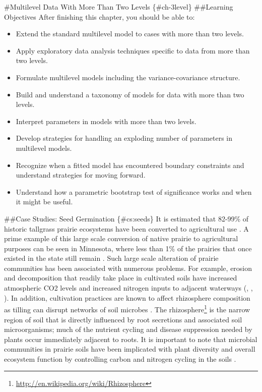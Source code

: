 \documentclass[
]{krantz}
\providecommand{\tightlist}{%
  \setlength{\itemsep}{0pt}\setlength{\parskip}{0pt}}
\renewcommand{\href}[2]{#2\footnote{\url{#1}}}
\begin{document}
\#Multilevel Data With More Than Two Levels \{\#ch-3level\}
\#\#Learning Objectives
After finishing this chapter, you should be able to:

\begin{itemize}
\tightlist
\item
  Extend the standard multilevel model to cases with more than two levels.
\item
  Apply exploratory data analysis techniques specific to data from more than two levels.
\item
  Formulate multilevel models including the variance-covariance structure.
\item
  Build and understand a taxonomy of models for data with more than two levels.
\item
  Interpret parameters in models with more than two levels.
\item
  Develop strategies for handling an exploding number of parameters in multilevel models.
\item
  Recognize when a fitted model has encountered boundary constraints and understand strategies for moving forward.
\item
  Understand how a parametric bootstrap test of significance works and when it might be useful.
\end{itemize}

\#\#Case Studies: Seed Germination \{\#cs:seeds\}
It is estimated that 82-99\% of historic tallgrass prairie ecosystems have been converted to agricultural use \citep{Baer2002}. A prime example of this large scale conversion of native prairie to agricultural purposes can be seen in Minnesota, where less than 1\% of the prairies that once existed in the state still remain \citep{Camill2004}. Such large scale alteration of prairie communities has been associated with numerous problems. For example, erosion and decomposition that readily take place in cultivated soils have increased atmospheric CO2 levels and increased nitrogen inputs to adjacent waterways (\citet{Baer2002}, \citet{Camill2004}, \citet{Knops2000}). In addition, cultivation practices are known to affect rhizosphere composition as tilling can disrupt networks of soil microbes \citep{Allison2005}. The \href{http://en.wikipedia.org/wiki/Rhizosphere}{rhizosphere} is the narrow region of soil that is directly influenced by root secretions and associated soil microorganisms; much of the nutrient cycling and disease suppression needed by plants occur immediately adjacent to roots. It is important to note that microbial communities in prairie soils have been implicated with plant diversity and overall ecosystem function by controlling carbon and nitrogen cycling in the soils \citep{Zak2003}.
\end{document}
